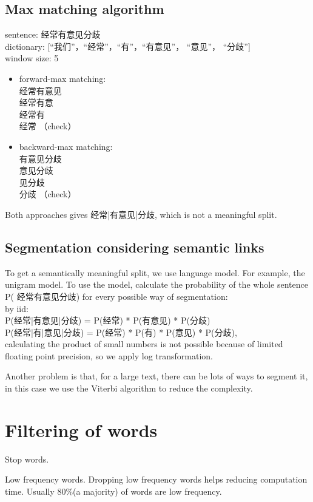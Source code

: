 \documentclass{report}
\begin{document}
\subsection{Max matching algorithm}
{\noindent sentence: 经常有意见分歧}\\
dictionary: [“我们”，“经常”，“有”，“有意见”， “意见”， “分歧”]\\
window size: 5

\begin{itemize}
	\item forward-max matching:\\
		经常有意见\\
		经常有意\\
		经常有\\
		经常 （check）
	\item backward-max matching:\\
		有意见分歧\\
		意见分歧\\
		见分歧\\
		分歧 （check）
\end{itemize}
Both approaches gives 经常|有意见|分歧, which is not a meaningful split.

\subsection{Segmentation considering semantic links}
To get a semantically meaningful split, we use language model. For example, the unigram model. To use the model, calculate the probability of the whole sentence P( 经常有意见分歧) for every possible way of segmentation: \\ 
by iid:\\
P(经常|有意见|分歧) = P(经常) * P(有意见) * P(分歧) \\
P(经常|有|意见|分歧) = P(经常) * P(有) * P(意见) * P(分歧),\\
calculating the product of small numbers is not possible because of limited floating point precision, so we apply log transformation.

Another problem is that, for a large text, there can be lots of ways to segment it, in this case we use the Viterbi algorithm to reduce the complexity.

\section{Filtering of words}
Stop words.

Low frequency words. Dropping low frequency words helps reducing computation time. Usually 80\%(a majority) of words are low frequency.
\end{document}
